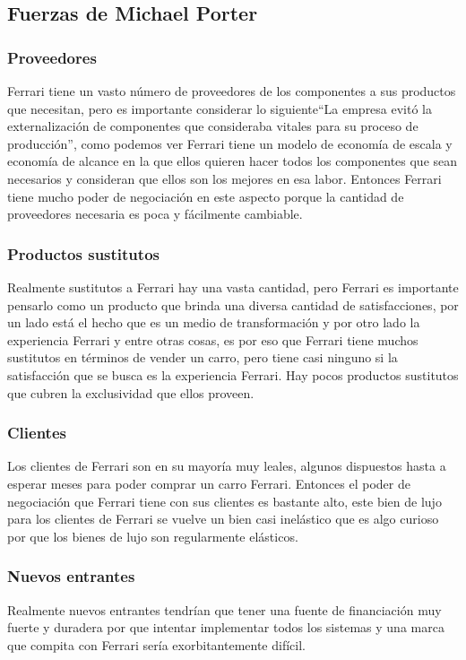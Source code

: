 \documentclass{article}
\begin{document}
\subsection{Fuerzas de Michael Porter}
\subsubsection{Proveedores}%
Ferrari tiene un vasto número de proveedores de los componentes a sus productos que necesitan, pero es importante considerar lo siguiente``La empresa evitó la externalización de componentes que consideraba vitales para su proceso de producción'', como podemos ver Ferrari tiene un modelo de economía de escala y economía de alcance en la que ellos quieren hacer todos los componentes que sean necesarios y consideran que ellos son los mejores en esa labor. Entonces Ferrari tiene mucho poder de negociación en este aspecto porque la cantidad de proveedores necesaria es poca y fácilmente cambiable.


\subsubsection{Productos sustitutos}%
Realmente sustitutos a Ferrari hay una vasta cantidad, pero Ferrari es importante pensarlo como un producto que brinda una diversa cantidad de satisfacciones, por un lado está el hecho que es un medio de transformación y por otro lado la experiencia Ferrari y entre otras cosas, es por eso que Ferrari tiene muchos sustitutos en términos de vender un carro, pero tiene casi ninguno si la satisfacción que se busca es la experiencia Ferrari. Hay pocos productos sustitutos que cubren la exclusividad que ellos proveen. 


\subsubsection{Clientes}%
Los clientes de Ferrari son en su mayoría muy leales, algunos dispuestos hasta a esperar meses para poder comprar un carro Ferrari. Entonces el poder de negociación que Ferrari tiene con sus clientes es bastante alto, este bien de lujo para los clientes de Ferrari se vuelve un bien casi inelástico que es algo curioso por que los bienes de lujo son regularmente elásticos.

\subsubsection{Nuevos entrantes}%
Realmente nuevos entrantes tendrían que tener una fuente de financiación muy fuerte y duradera por que intentar implementar todos los sistemas y una marca que compita con Ferrari sería exorbitantemente difícil.
\end{document}
